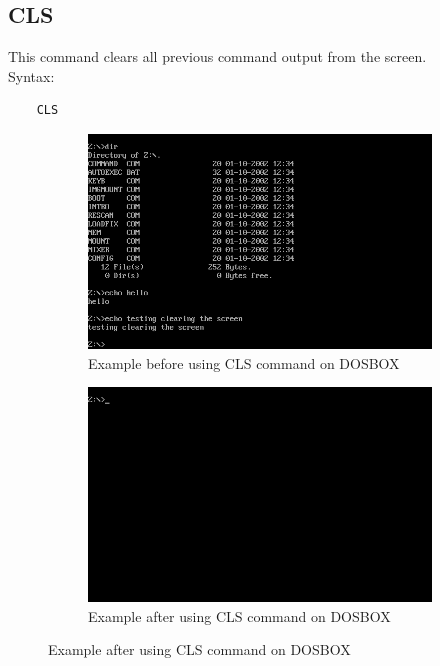 \documentclass[17pt,a4paper,oneside,margin=1in]{article}
\begin{document}
\subsection{CLS}
This command clears all previous command output from the screen.\\
Syntax: \\
\begin{verbatim}
	CLS
\end{verbatim}
\begin{figure}[ht]
	\begin{subfigure}
		\centering
		\includegraphics[width=0.8\linewidth]{./scrot/cls1.png}
		\caption{Example before using CLS command on DOSBOX}
		\label{fig:sub-first}
	\end{subfigure}
	\begin{subfigure}
		\centering
		\includegraphics[width=0.8\linewidth]{./scrot/cls2.png}
		\caption{Example after using CLS command on DOSBOX}
		\label{fig:sub-second}
	\end{subfigure}
\end{figure}
\pagebreak
\end{document}
